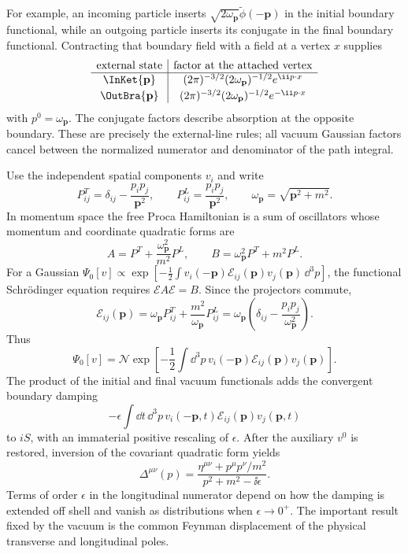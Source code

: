 \begin{enumerate}
For example, an incoming particle inserts
\(\sqrt{2\omega_{\mathbf p}}\widetilde\phi(-\mathbf p)\) in the initial boundary
functional, while an outgoing particle inserts its conjugate in the final
boundary functional.  Contracting that boundary field with a field at a
vertex \(x\) supplies
\[
 \begin{array}{c|c}
 \text{external state}&\text{factor at the attached vertex}\\ \hline
 \InKet{\mathbf p}&
 (2\pi)^{-3/2}(2\omega_{\mathbf p})^{-1/2}e^{\ii p\cdot x}\\[2pt]
 \OutBra{\mathbf p}&
 (2\pi)^{-3/2}(2\omega_{\mathbf p})^{-1/2}e^{-\ii p\cdot x}
 \end{array}
\]
with \(p^0=\omega_{\mathbf p}\).  The conjugate factors describe absorption at
the opposite boundary.  These are precisely the external-line rules; all
vacuum Gaussian factors cancel between the normalized numerator and
denominator of the path integral.

Use the independent spatial components \(v_i\) and write
\[
 P^T_{ij}=\delta_{ij}-\frac{p_ip_j}{\mathbf p^2},
\qquad
 P^L_{ij}=\frac{p_ip_j}{\mathbf p^2},
\qquad \omega_{\mathbf p}=\sqrt{\mathbf p^2+m^2}.
\]
In momentum space the free Proca Hamiltonian is a sum of oscillators whose
momentum and coordinate quadratic forms are
\[
 A=P^T+\frac{\omega_{\mathbf p}^2}{m^2}P^L,
\qquad
 B=\omega_{\mathbf p}^2P^T+m^2P^L.
\]
For a Gaussian
\(\Psi_0[v]\propto\exp[-\tfrac12\int v_i(-\mathbf p)
\mathcal E_{ij}(\mathbf p)v_j(\mathbf p)\,\dd^3p]\), the functional
Schrödinger equation requires
\(\mathcal E A\mathcal E=B\).  Since the projectors commute,
\[
 \boxed{\quad
 \mathcal E_{ij}(\mathbf p)
 =\omega_{\mathbf p}P^T_{ij}
 +\frac{m^2}{\omega_{\mathbf p}}P^L_{ij}
 =\omega_{\mathbf p}\left(
 \delta_{ij}-\frac{p_ip_j}{\omega_{\mathbf p}^2}\right).
 \quad}
\]
Thus
\[
 \Psi_0[v]=\mathcal N\exp\left[-\frac12\int \dd^3p\,
 v_i(-\mathbf p)\mathcal E_{ij}(\mathbf p)v_j(\mathbf p)\right].
\]
The product of the initial and final vacuum functionals adds the
convergent boundary damping
\[
 -\epsilon\int \dd t\,\dd^3p\,
 v_i(-\mathbf p,t)\mathcal E_{ij}(\mathbf p)v_j(\mathbf p,t)
\]
to \(iS\), with an immaterial positive rescaling of \(\epsilon\).
After the auxiliary \(v^0\) is restored, inversion of the covariant
quadratic form yields
\[
 \boxed{\quad
 \Delta^{\mu\nu}(p)=
 \frac{\eta^{\mu\nu}+p^\mu p^\nu/m^2}
      {p^2+m^2-\ii\epsilon}.
 \quad}
\]
Terms of order \(\epsilon\) in the longitudinal numerator depend on how
the damping is extended off shell and vanish as distributions when
\(\epsilon\to0^+\).  The important result fixed by the vacuum is the common
Feynman displacement of the physical transverse and longitudinal poles.


\end{enumerate}
